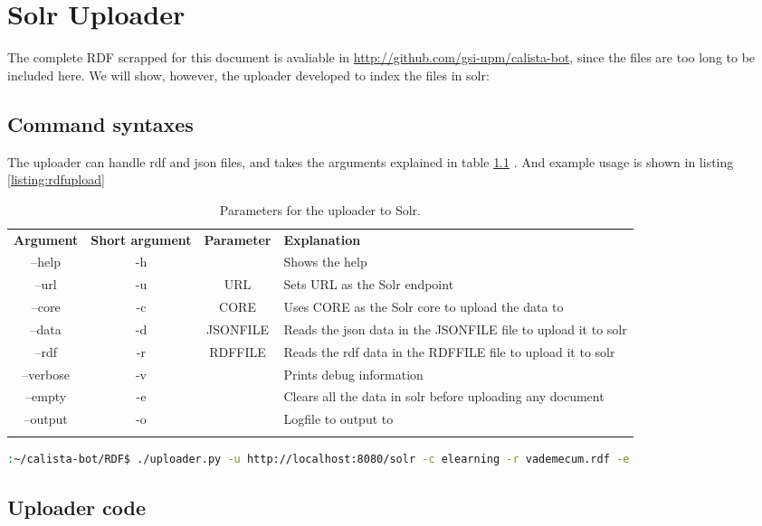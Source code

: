 \chapter{Solr Uploader}

The complete RDF scrapped for this document is avaliable in \url{http://github.com/gsi-upm/calista-bot}, since the files are too long to be included here. We will show, however, the uploader developed to index the files in solr:

\section{Command syntaxes}

The uploader can handle rdf and json files, and takes the arguments explained in table \ref{tab:uploaderparams} . And example usage is shown in listing \ref{listing:rdfupload}

\begin{table}
  \centering
  \begin{tabular*}{0.9\textwidth}{| c | c | c | p{} |}
    \hhline{|-|-|-|-|}
    \textbf{Argument} & \textbf{Short argument} & \textbf{Parameter}& \textbf{Explanation} \\ \hhline{|=|=|=|=|}
    --help & -h &  & Shows the help\\ \hhline{|-|-|-|-|} 
    --url & -u & URL & Sets URL as the Solr endpoint \\ \hhline{|-|-|-|-|} 
    --core & -c & CORE & Uses CORE as the Solr core to upload the data to\\ \hhline{|-|-|-|-|} 
    --data & -d & JSONFILE & Reads the json data in the JSONFILE file to upload it to solr\\ \hhline{|-|-|-|-|} 
    --rdf & -r & RDFFILE & Reads the rdf data in the RDFFILE file to upload it to solr \\ \hhline{|-|-|-|-|} 
    --verbose & -v & & Prints debug information \\ \hhline{|-|-|-|-|} 
    --empty & -e & & Clears all the data in solr before uploading any document \\ \hhline{|-|-|-|-|} 
    --output & -o & & Logfile to output to \\ \hhline{|-|-|-|-|} 
    \end{tabular*}
  \caption{Parameters for the uploader to Solr.}
  \label{tab:uploaderparams}
\end{table}


\begin{center} 
  \begin{lstlisting}[language=bash, captionpos=b, caption=Example command to upload the vademecum data into Solr, label=listing:rdfupload]
  :~/calista-bot/RDF$ ./uploader.py -u http://localhost:8080/solr -c elearning -r vademecum.rdf -e
  \end{lstlisting}
\end{center}

\section{Uploader code}

\begin{center}
  
\end{center}
